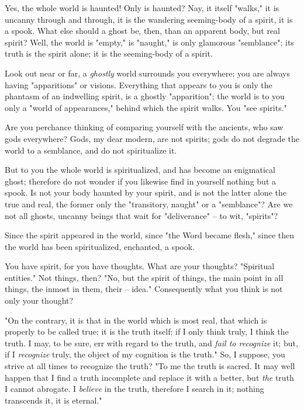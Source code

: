 \documentclass[a4paper]{book}
\begin{document}
Yes, the whole world is haunted! Only is haunted? Nay, it itself "{}walks,"{} 
it is uncanny through and through, it is the wandering seeming-body of a 
spirit, it is a spook. What else should a ghost be, then, than an apparent 
body, but real spirit? Well, the world is "{}empty,"{} is "{}naught,"{} is 
only glamorous "{}semblance"{}; its truth is the spirit alone; it is the 
seeming-body of a spirit.

Look out near or far, a \textit{ghostly} world surrounds you everywhere; you 
are always having "{}apparitions"{} or visions. Everything that appears to you 
is only the phantasm of an indwelling spirit, is a ghostly "{}apparition"{}; 
the world is to you only a "{}world of appearances,"{} behind which the spirit 
walks. You "{}see spirits."{}

Are you perchance thinking of comparing yourself with the ancients, who saw 
gods everywhere? Gods, my dear modern, are not spirits; gods do not degrade 
the world to a semblance, and do not spiritualize it.

But to you the whole world is spiritualized, and has become an enigmatical 
ghost; therefore do not wonder if you likewise find in yourself nothing but a 
spook. Is not your body haunted by your spirit, and is not the latter alone 
the true and real, the former only the "{}transitory, naught"{} or a 
"{}semblance"{}? Are we not all ghosts, uncanny beings that wait for 
"{}deliverance"{} -- to wit, "{}spirits"{}?

Since the spirit appeared in the world, since "{}the Word became flesh,"{} 
since then the world has been spiritualized, enchanted, a spook.

You have spirit, for you have thoughts. What are your thoughts? "{}Spiritual 
entities."{} Not things, then? "{}No, but the spirit of things, the main point 
in all things, the inmost in them, their -- idea."{} Consequently what you 
think is not only your thought?

"{}On the contrary, it is that in the world which is most real, that which is 
properly to be called true; it is the truth itself; if I only think truly, I 
think the truth. I may, to be sure, err with regard to the truth, and 
\textit{fail to recognize} it; but, if I \textit{recognize} truly, the object 
of my cognition is the truth."{} So, I suppose, you strive at all times to 
recognize the truth? "{}To me the truth is sacred. It may well happen that I 
find a truth incomplete and replace it with a better, but \textit{the} truth I 
cannot abrogate. I \textit{believe} in the truth, therefore I search in it; 
nothing transcends it, it is eternal."{}
\end{document}
